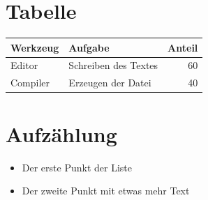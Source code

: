 \documentclass[11pt,a4paper]{article}
\begin{document}
\section{Tabelle}

\begin{tabular}{@{}llr@{}}
    \toprule
    Werkzeug & Aufgabe & Anteil \\
    \midrule
    Editor & Schreiben des Textes & 60 \\
    Compiler & Erzeugen der Datei & 40 \\
    \bottomrule
\end{tabular}

\section{Aufzählung}

\begin{itemize}
    \item Der erste Punkt der Liste
    \item Der zweite Punkt mit etwas mehr Text
\end{itemize}
\end{document}
